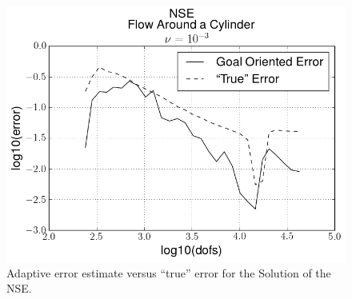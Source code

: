     \begin{figure}[H]
        \centering
        \includegraphics[scale=0.5]{Figures/AdaptiveCylinder.png}
        \caption{Adaptive error estimate versus ``true'' error for the Solution
            of the NSE.}
        \label{fig:NSE_err}
    \end{figure}

